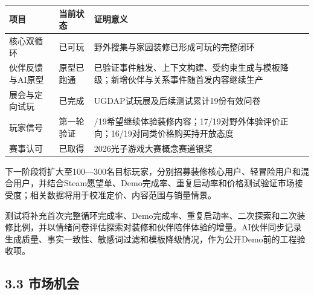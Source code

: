 \documentclass[UTF8,fontset=none,zihao=5,twoside]{ctexart}
\newcounter{none}
\newenvironment{BusinessTable}{%
  \begingroup
  \small
  \setlength{\parindent}{0pt}%
  \setlength{\parskip}{0pt}%
  \rowcolors{2}{TableAlt}{white}%
}{%
  \endgroup
}
\begin{document}
\begin{BusinessTable}

{\def\LTcaptype{none} %
\begin{longtable}[]{@{}
  >{\raggedright\arraybackslash}p{}
  >{\raggedright\arraybackslash}p{}
  >{\raggedright\arraybackslash}p{}@{}}
\toprule\noalign{}
\begin{minipage}[b]{\linewidth}\raggedright
\cellcolor{TableHeader}\color{BrandBlue}\bfseries 项目
\end{minipage} & \begin{minipage}[b]{\linewidth}\raggedright
\cellcolor{TableHeader}\color{BrandBlue}\bfseries 当前状态
\end{minipage} & \begin{minipage}[b]{\linewidth}\raggedright
\cellcolor{TableHeader}\color{BrandBlue}\bfseries 证明意义
\end{minipage} \\
\midrule\noalign{}
\endhead
\bottomrule\noalign{}
\endlastfoot
核心双循环 & 已可玩 & 野外搜集与家园装修已形成可玩的完整闭环 \\
伙伴反馈与AI原型 & 原型已跑通 & 已验证事件触发、上下文构建、受约束生成与模板降级；新增伙伴与关系事件随首发内容继续生产 \\
展会与定向试玩 & 已完成 & UGDAP试玩展及后续测试累计19份有效问卷 \\
玩家信号 & 第一轮验证 & 18/19希望继续体验装修内容；17/19对野外体验评价正向；16/19对同类价格购买持开放态度 \\
赛事认可 & 已取得 & 2026光子游戏大赛概念赛道银奖 \\
\end{longtable}
}

\end{BusinessTable}

下一阶段将扩大至100---300名目标玩家，分别招募装修核心用户、轻冒险用户和混合用户，并结合Steam愿望单、Demo完成率、重复启动率和价格测试验证市场接受度；相关数据将用于校准定价、内容范围与销量情景。

测试将补充首次完整循环完成率、Demo完成率、重复启动率、二次探索和二次装修比例，并以情绪问卷评估探索对装修和伙伴陪伴体验的增量。AI伙伴同步记录生成质量、事实一致性、敏感词过滤和模板降级情况，作为公开Demo前的工程验收项。

\subsection{3.3 市场机会}\label{33-ux5e02ux573aux673aux4f1a}
\end{document}
